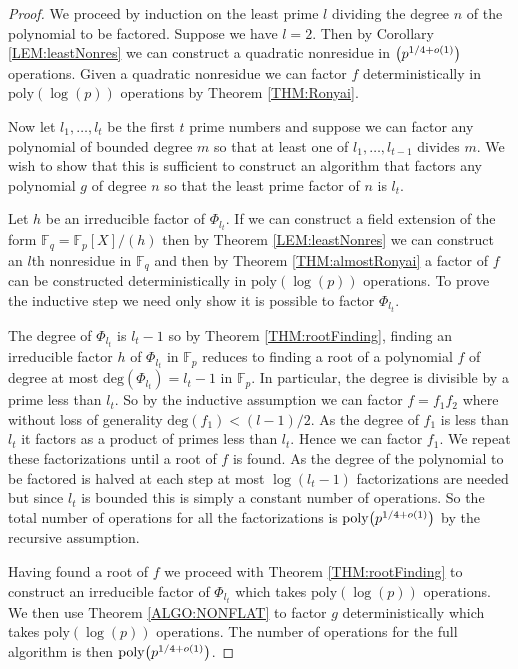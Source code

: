 \documentclass{article}
\let\originalleft\left
\let\originalright\right
\renewcommand{\left}{\mathopen{}\mathclose\bgroup\originalleft}
\renewcommand{\right}{\aftergroup\egroup\originalright}
\theoremstyle{plain}
\theoremstyle{definition}
\def\Fp {{ \mathbb{F} _ {p} }}
\def\Fq {{ \mathbb{F} _ {q} }}
\def\deg {{ \mathrm{deg}}}
\def\poly {{ \mathrm{poly} }}
\begin{document}
		\begin{proof}
		    We proceed by induction on the least prime $l$ dividing the degree $n$ of the polynomial to be factored. Suppose we have $l=2$. Then by Corollary \ref{LEM:leastNonres} we can construct a quadratic nonresidue in $\left(p^{1/4+o(1)} \right)$ operations. Given a quadratic nonresidue we can factor $f$ deterministically in $\poly(\log(p))$ operations by Theorem \ref{THM:Ronyai}.
				
				Now let $l_1,\ldots,l_t$ be the first $t$ prime numbers and suppose we can factor any polynomial of bounded degree $m$ so that at least one of $l_1,\ldots,l_{t-1}$ divides $m$. We wish to show that this is sufficient to construct an algorithm that factors any polynomial $g$ of degree $n$ so that the least prime factor of $n$ is $l_t$. 
				
				Let $h$ be an irreducible factor of $\Phi_{l_t}$. If we can construct a field extension of the form $\Fq=\Fp[X]/(h)$ then by Theorem \ref{LEM:leastNonres} we can construct an $l$th nonresidue in $\Fq$ and then by Theorem \ref{THM:almostRonyai} a factor of $f$ can be constructed deterministically in $\poly(\log(p))$ operations. To prove the inductive step we need only show it is possible to factor $\Phi_{l_t}$. 
				
				The degree of $\Phi_{l_t}$ is $l_t-1$ so by Theorem \ref{THM:rootFinding}, finding an irreducible factor $h$ of $\Phi_{l_t}$ in $\Fp$ reduces to finding a root of a polynomial $f$ of degree at most $\deg(\Phi_{l_t})=l_t-1$ in $\Fp$. In particular, the degree is divisible by a prime less than $l_t$. So by the inductive assumption we can factor $f=f_1 f_2$ where without loss of generality $\deg(f_1)<(l-1)/2$. As the degree of $f_1$ is less than $l_t$ it factors as a product of primes less than $l_t$. Hence we can factor $f_1$. We repeat these factorizations until a root of $f$ is found. As the degree of the polynomial to be factored is halved at each step at most $\log(l_t-1)$ factorizations are needed but since $l_t$ is bounded this is simply a constant number of operations. So the total number of operations for all the factorizations is $\poly \left( p^{1/4+o(1)} \right)$ by the recursive assumption.
				
				Having found a root of $f$ we proceed with Theorem \ref{THM:rootFinding} to construct an irreducible factor of $\Phi_{l_t}$ which takes $\poly(\log(p))$ operations. We then use Theorem \ref{ALGO:NONFLAT} to factor $g$ deterministically which takes $\poly(\log(p))$ operations. The number of operations for the full algorithm is then $\poly \left(p^{1/4+o(1)} \right)$.
				
		\end{proof}
				
\end{document}

